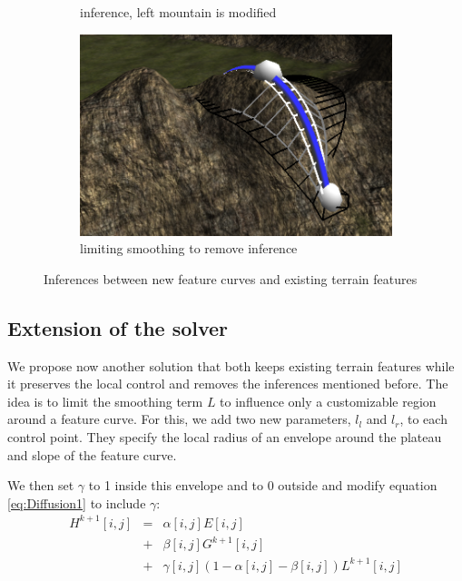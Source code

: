 \documentclass[journal, letterpaper]{IEEEtran}
\begin{document}
\begin{figure}
\begin{subfigure}[b]{0.3\textwidth}
		\caption{inference, left mountain is modified}
		\label{fig:diffusionError2}
	\end{subfigure}
	\begin{subfigure}[b]{0.3\textwidth}
		\includegraphics[width=\textwidth]{images/diffusionErrorSolved}
		\caption{limiting smoothing to remove inference}
		\label{fig:diffusionError3}
	\end{subfigure}
	\caption{Inferences between new feature curves and existing terrain features}\label{fig:diffusion3}
\end{figure}

\subsection{Extension of the solver}
We propose now another solution that both keeps existing terrain features while it preserves the local control and removes the inferences mentioned before.
The idea is to limit the smoothing term $L$ to influence only a customizable region around a feature curve.
For this, we add two new parameters, $l_l$ and $l_r$, to each control point. They specify the local radius of an envelope around the plateau and slope of the feature curve.

We then set $\gamma$ to 1 inside this envelope and to 0 outside and modify equation \ref{eq:Diffusion1} to include $\gamma$:
\begin{equation}
\begin{array}{rcl}
	H^{k+1}[i,j] &=& \alpha[i,j] E[i,j]  \\
	             &+& \beta[i,j] G^{k+1}[i,j]  \\
							 &+& \gamma[i,j] (1-\alpha[i,j]-\beta[i,j]) L^{k+1}[i,j]
\end{array}
\label{eq:Diffusion1_mod}
\end{equation}
\end{document}
